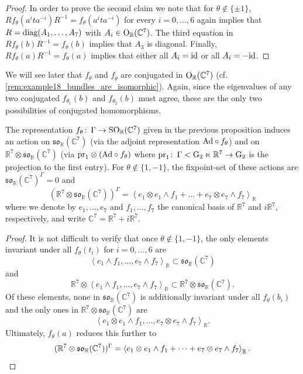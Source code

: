 \documentclass[11pt,a4paper]{scrartcl}
\newcommand{\col}{\colon \thinspace}
\newcommand{\pr}{\textup{pr}}
\newcommand{\Ad}{\textup{Ad}}
\newcommand{\id}{\textup{id}}
\newcommand{\diag}{\textup{diag}}
\newcommand{\G}{\textup{G}}
\newcommand{\SO}{\textup{SO}}
\renewcommand{\O}{\textup{O}}
\numberwithin{equation}{section}
\theoremstyle{plain}
\theoremstyle{definition}
\theoremstyle{remark}
\begin{document}
\begin{proof}
In order to prove the second claim we note that for $\theta \notin\{\pm 1\}$, $Rf_{\theta}(a^{i}ta^{-i}) R^{-1} =f_\theta (a^{i}ta^{-i})$ for every $i=0,\dots,6$ again implies that $R= \diag(A_1,\dots,A_7)$ with $A_i \in \O_{\mathbb{R}}(\mathbb{C}^7)$. The third equation in $R f_\theta(b) R^{-1} =f_{\theta}(b)$ implies that $A_3$ is diagonal. Finally, $Rf_\theta(a) R^{-1} =f_{\theta}(a)$ implies that either all $A_i = \id$ or all $A_i = -\id$.
\end{proof}

\begin{remark}
We will see later that $f_{\theta}$ and $f_{\overline{\theta}}$ are conjugated in $\O_\mathbb{R}(\mathbb{C}^7)$ (cf. \autoref{rem:example18_bundles_are_isomorphic}). Again, since the eigenvalues of any two conjugated $f_{\theta_1}(b)$ and $f_{\theta_2}(b)$ must agree, these are the only two possibilities of conjugated homomorphisms.
\end{remark}

\begin{lemma}\label{lem:Example18_fixpoint_set_flambda}
The representation $f_\theta \col \Gamma \to \SO_\mathbb{R}(\mathbb{C}^7)$ given in the previous proposition induces an action on $\mathfrak{so}_\mathbb{R}(\mathbb{C}^7)$ (via the adjoint representation $\Ad \circ f_\theta$) and on $\mathbb{R}^7 \otimes \mathfrak{so}_\mathbb{R}(\mathbb{C}^7)$ (via $\pr_1 \otimes (\Ad \circ f_\theta)$ where $\pr_1 \col \Gamma < \G_2\ltimes\mathbb{R}^7 \to \G_2$ is the projection to the first entry). For $\theta \notin \{1,-1\}$, the fixpoint-set of these actions are $\mathfrak{so}_\mathbb{R}(\mathbb{C}^7)^{\Gamma} = 0 $ and \[(\mathbb{R}^7 \otimes \mathfrak{so}_\mathbb{R}(\mathbb{C}^7))^{\Gamma} = \left\langle e_1 \otimes e_1 \wedge f_1 + \dots + e_7 \otimes e_7 \wedge f_7 \right\rangle_\mathbb{R}\] where we denote by $e_1,\dots,e_7$ and $f_1,\dots,f_7$ the canonical basis of $\mathbb{R}^7$ and $i\mathbb{R}^7$, respectively, and write $\mathbb{C}^7 = \mathbb{R}^7+i\mathbb{R}^7$.
\end{lemma}
\begin{proof}
It is not difficult to verify that once $\theta \notin \{1,-1\}$, the only elements invariant under all $f_\theta(t_i)$ for $i=0,\dots,6$ are \[\left\langle e_1\wedge f_1, \dots, e_7\wedge f_7 \right\rangle_\mathbb{R} \subset \mathfrak{so}_\mathbb{R}(\mathbb{C}^7) \] and \[\mathbb{R}^7 \otimes \left\langle e_1\wedge f_1, \dots, e_7\wedge f_7 \right\rangle_\mathbb{R} \subset \mathbb{R}^7\otimes \mathfrak{so}_\mathbb{R}(\mathbb{C}^7).\]
Of these elements, none in $\mathfrak{so}_\mathbb{R}(\mathbb{C}^7)$ is additionally invariant under all $f_\theta(b_i)$ and the only ones in $\mathbb{R}^7 \otimes \mathfrak{so}_\mathbb{R}(\mathbb{C}^7)$ are \[ \left\langle e_1 \otimes e_1 \wedge f_1, \dots, e_7 \otimes e_7 \wedge f_7 \right\rangle_\mathbb{R}. \] Ultimately, $f_\theta(a)$ reduces this further to \[ (\mathbb{R}^7 \otimes \mathfrak{so}_\mathbb{R}(\mathbb{C}^7))^{\Gamma} = \left\langle e_1 \otimes e_1 \wedge f_1 + \dots + e_7 \otimes e_7 \wedge f_7 \right\rangle_\mathbb{R}. \qedhere \]
\end{proof}
\end{document}
